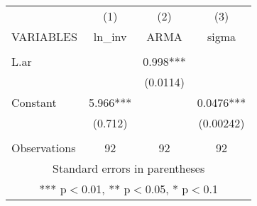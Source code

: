 \setlength{\pdfpagewidth}{8.5in} \setlength{\pdfpageheight}{11in}
\begin{tabular}{lccc} \hline
 & (1) & (2) & (3) \\
VARIABLES & ln\_inv & ARMA & sigma \\ \hline
 &  &  &  \\
L.ar &  & 0.998*** &  \\
 &  & (0.0114) &  \\
Constant & 5.966*** &  & 0.0476*** \\
 & (0.712) &  & (0.00242) \\
 &  &  &  \\
 Observations & 92 & 92 & 92 \\ \hline
\multicolumn{4}{c}{ Standard errors in parentheses} \\
\multicolumn{4}{c}{ *** p$<$0.01, ** p$<$0.05, * p$<$0.1} \\
\end{tabular}
